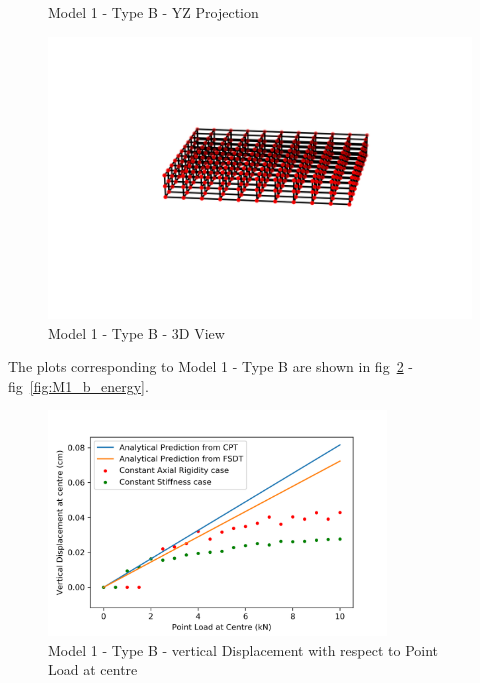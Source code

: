 \begin{figure}[!htbp]
\begin{minipage}{0.3\textwidth}
    \caption{Model 1 - Type B - YZ Projection}
    \label{fig:M1_b_YZ}
\end{minipage}
\hspace{5mm}
\begin{minipage}{0.3\textwidth}
    \centering
    \includegraphics[width = 1\textwidth]{Figures/M1_b_3D.png}
    \caption{Model 1 - Type B - 3D View}
    \label{fig:M1_b_3D}
\end{minipage}
\end{figure}

The plots corresponding to Model 1 - Type B are shown in fig~\ref{fig:M1_b_plt} - fig~\ref{fig:M1_b_energy}.

\begin{figure}[!htbp]
    \centering
    \includegraphics[width = 0.8\textwidth]{Figures/M1_b_plt.png}
    \caption{Model 1 - Type B - vertical Displacement with respect to Point Load at centre}
    \label{fig:M1_b_plt}
\end{figure}

